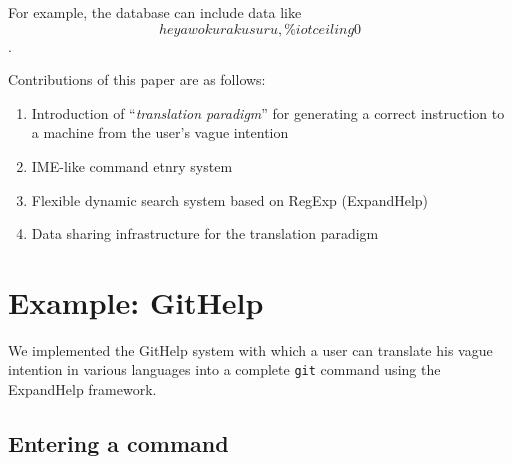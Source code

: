 \documentclass{sigchi}
\def\GH{\textsf{GitHelp}}
\def\EH{\textsf{ExpandHelp}}
\begin{document}
For example, the database can include data like
\texttt{\[ heya wo kuraku suru, \% iot ceiling 0 \]}.


Contributions of this paper are as follows:

\begin{enumerate}
\item Introduction of ``\textit{translation paradigm}'' for
  generating a correct instruction to a machine from
  the user's vague intention
\item IME-like command etnry system
\item Flexible dynamic search system based on RegExp (ExpandHelp)
\item Data sharing infrastructure for the translation paradigm
\end{enumerate}

\section{Example: GitHelp}

We implemented the {\GH} system
with which a user can translate his vague intention in various languages
into a complete \texttt{git} command
using the {\EH} framework.

\subsection{Entering a command}
\end{document}
